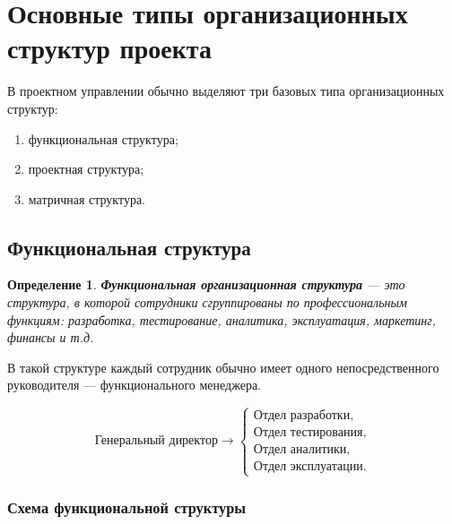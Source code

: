 \documentclass[12pt,a4paper]{article}
\newtheorem{definition}{Определение}
\begin{document}
\section{Основные типы организационных структур проекта}

В проектном управлении обычно выделяют три базовых типа организационных структур:
\begin{enumerate}
    \item функциональная структура;
    \item проектная структура;
    \item матричная структура.
\end{enumerate}

\subsection{Функциональная структура}

\begin{definition}
\textbf{Функциональная организационная структура} --- это структура, в которой сотрудники сгруппированы по профессиональным функциям: разработка, тестирование, аналитика, эксплуатация, маркетинг, финансы и т.д.
\end{definition}

В такой структуре каждый сотрудник обычно имеет одного непосредственного руководителя --- функционального менеджера.

\[
\text{Генеральный директор}
\rightarrow
\begin{cases}
\text{Отдел разработки},\\
\text{Отдел тестирования},\\
\text{Отдел аналитики},\\
\text{Отдел эксплуатации}.
\end{cases}
\]

\subsubsection*{Схема функциональной структуры}

\begin{center}
\end{center}
\end{document}
